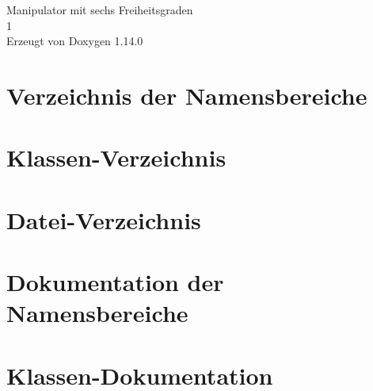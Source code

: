 \documentclass[twoside]{book}
\newcommand{\+}{\discretionary{\mbox{\scriptsize$\hookleftarrow$}}{}{}}
\newcommand{\clearemptydoublepage}{%
    \newpage{\pagestyle{empty}\cleardoublepage}%
  }
\begin{document}
  \raggedbottom
    \hypersetup{pageanchor=false,
                bookmarksnumbered=true,
                pdfencoding=unicode
               }
  \begin{titlepage}
  \vspace*{7cm}
  \begin{center}%
  {\Large Manipulator mit sechs Freiheitsgraden}\\
  [1ex]\large 1 \\
  \vspace*{1cm}
  {\large Erzeugt von Doxygen 1.14.0}\\
  \end{center}
  \end{titlepage}
  \clearemptydoublepage
  \tableofcontents
  \clearemptydoublepage
  \hypersetup{pageanchor=true}
\chapter{Verzeichnis der Namensbereiche}

\chapter{Klassen-\/\+Verzeichnis}

\chapter{Datei-\/\+Verzeichnis}

\chapter{Dokumentation der Namensbereiche}


\chapter{Klassen-\/\+Dokumentation}















\end{document}

